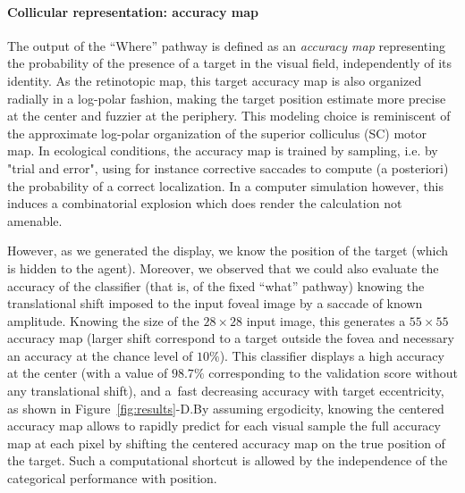 \paragraph{Collicular representation: accuracy map}
The output of the ``Where'' pathway is defined as an \emph{accuracy map} representing the probability of the presence of a target in the visual field, independently of its identity. As the retinotopic map, this target accuracy map is also organized radially in a log-polar fashion, making the target position estimate more precise at the center and fuzzier at the periphery. \ICANN This modeling choice is reminiscent of the approximate log-polar organization of the superior colliculus (SC) motor map. In ecological conditions, the accuracy map is trained by sampling, i.e. by "trial and error", using for instance corrective saccades to compute (a posteriori) the probability of a correct localization. In a computer simulation however, this induces a combinatorial explosion which does render the calculation not amenable.\fi

However, as we generated the display, we know the position of the target (which is hidden to the agent). Moreover, we observed that we could also evaluate the accuracy of the classifier (that is, of the fixed ``what'' pathway) knowing the translational shift imposed to the input foveal image by a saccade of known amplitude. Knowing the size of the $28\times 28$ input image, this generates a $55\times 55$ accuracy map (larger shift correspond to a target outside the fovea and necessary an accuracy at the chance level of $10\%$). \ICANN This classifier displays a high accuracy at the center  (with a value of $98.7\%$ corresponding to the validation score without any translational shift), and a fast decreasing accuracy with target eccentricity, as shown in Figure~\ref{fig:results}-D.\fi By assuming ergodicity, knowing the centered accuracy map allows to rapidly predict for each visual sample the full accuracy map at each pixel by shifting the centered accuracy map on the true position of the target. Such a computational shortcut is allowed by the independence of the categorical performance with position. %

